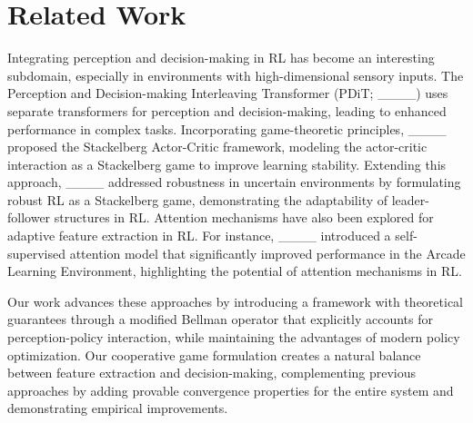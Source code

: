 \section{Related Work}
Integrating perception and decision-making in RL has become an interesting subdomain, especially in environments with high-dimensional sensory inputs. The Perception and Decision-making Interleaving Transformer (PDiT; ____) uses separate transformers for perception and decision-making, leading to enhanced performance in complex tasks. Incorporating game-theoretic principles, ____ proposed the Stackelberg Actor-Critic framework, modeling the actor-critic interaction as a Stackelberg game to improve learning stability. Extending this approach, ____ addressed robustness in uncertain environments by formulating robust RL as a Stackelberg game, demonstrating the adaptability of leader-follower structures in RL. Attention mechanisms have also been explored for adaptive feature extraction in RL. For instance, ____ introduced a self-supervised attention model that significantly improved performance in the Arcade Learning Environment, highlighting the potential of attention mechanisms in RL.

Our work advances these approaches by introducing a framework with theoretical guarantees through a modified Bellman operator that explicitly accounts for perception-policy interaction, while maintaining the advantages of modern policy optimization. Our cooperative game formulation creates a natural balance between feature extraction and decision-making, complementing previous approaches by adding provable convergence properties for the entire system and demonstrating empirical improvements.